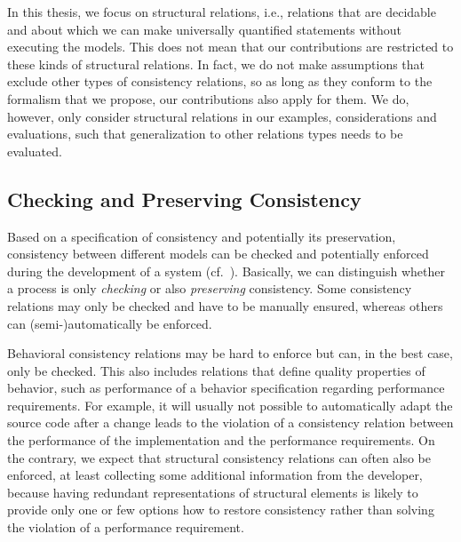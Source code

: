 In this thesis, we focus on structural relations, i.e., relations that are decidable and about which we can make universally quantified statements without executing the models.
This does not mean that our contributions are restricted to these kinds of structural relations.
In fact, we do not make assumptions that exclude other types of consistency relations, so as long as they conform to the formalism that we propose, our contributions also apply for them.
We do, however, only consider structural relations in our examples, considerations and evaluations, such that generalization to other relations types needs to be evaluated.


\subsection{Checking and Preserving Consistency}

Based on a specification of consistency and potentially its preservation, consistency between different models can be checked and potentially enforced during the development of a system (cf.~\cite{qvt}).
Basically, we can distinguish whether a process is only \emph{checking} or also \emph{preserving} consistency.
Some consistency relations may only be checked and have to be manually ensured, whereas others can (semi-)automatically be enforced.

Behavioral consistency relations may be hard to enforce but can, in the best case, only be checked.
This also includes relations that define quality properties of behavior, such as performance of a behavior specification regarding performance requirements.
For example, it will usually not possible to automatically adapt the source code after a change leads to the violation of a consistency relation between the performance of the implementation and the performance requirements.
On the contrary, we expect that structural consistency relations can often also be enforced, at least collecting some additional information from the developer, because having redundant representations of structural elements is likely to provide only one or few options how to restore consistency rather than solving the violation of a performance requirement.


